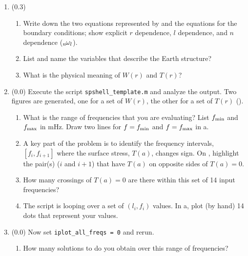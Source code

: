\documentclass[11pt,titlepage,fleqn]{article}
\newcommand{\omnl}{\mbox{${}_{n\hspace{-0.2 mm}}\omega_l$}}  %
\begin{document}
\begin{enumerate}
\item (0.3)
%
\begin{enumerate}
\item Write down the two equations represented by  and the equations for the boundary conditions; show explicit $r$ dependence, $l$ dependence, and $n$ dependence (\eg $\omnl$).
\item List and name the variables that describe the Earth structure?

\item What is the physical meaning of $W(r)$ and $T(r)$?
\end{enumerate}


\item (0.0) Execute the script \verb+spshell_template.m+ and analyze the output. Two figures are generated, one for a set of $W(r)$, the other for a set of $T(r)$ ().
%
\begin{enumerate}
\item What is the range of frequencies that you are evaluating? List $f_{\rm min}$ and $f_{\rm max}$ in mHz. Draw two lines for $f = f_{\rm min}$ and $f = f_{\rm max}$ in a.

\item A key part of the problem is to identify the frequency intervals, $[f_i, f_{i+1}]$ where the surface stress, $T(a)$, changes sign. On , highlight the pair(s) ($i$ and $i+1$) that have $T(a)$ on opposite sides of $T(a) = 0$.

\item How many crossings of $T(a) = 0$ are there within this set of 14 input frequencies?

\item The script is looping over a set of $(l_i, f_i)$ values. In a, plot (by hand) 14 dots that represent your values.

\end{enumerate}

\label{prob:Tr}


\item (0.0) Now set \verb+iplot_all_freqs = 0+ and rerun.
%
\begin{enumerate}
\item How many solutions to  do you obtain over this range of frequencies?


\end{enumerate}
\end{enumerate}
\end{document}
